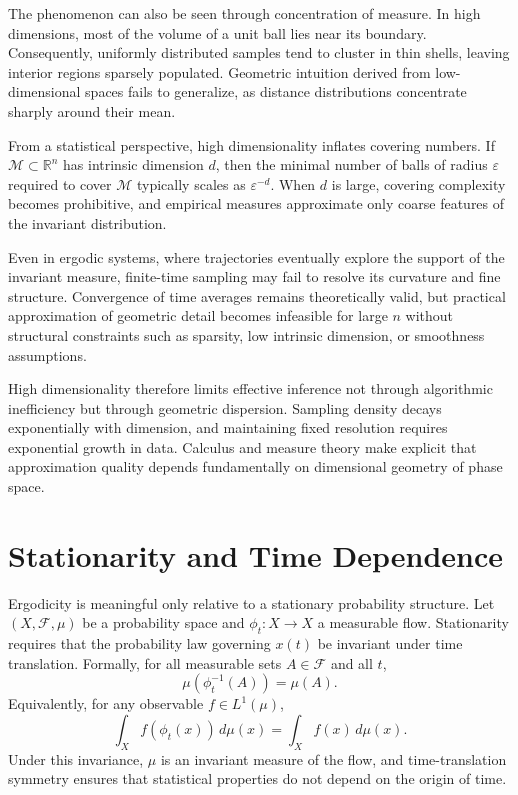 \documentclass[12pt]{book}
\begin{document}
The phenomenon can also be seen through concentration of measure. In high dimensions, most of the volume of a unit ball lies near its boundary. Consequently, uniformly distributed samples tend to cluster in thin shells, leaving interior regions sparsely populated. Geometric intuition derived from low-dimensional spaces fails to generalize, as distance distributions concentrate sharply around their mean.

From a statistical perspective, high dimensionality inflates covering numbers. If $\mathcal{M} \subset \mathbb{R}^n$ has intrinsic dimension $d$, then the minimal number of balls of radius $\varepsilon$ required to cover $\mathcal{M}$ typically scales as $\varepsilon^{-d}$. When $d$ is large, covering complexity becomes prohibitive, and empirical measures approximate only coarse features of the invariant distribution.

Even in ergodic systems, where trajectories eventually explore the support of the invariant measure, finite-time sampling may fail to resolve its curvature and fine structure. Convergence of time averages remains theoretically valid, but practical approximation of geometric detail becomes infeasible for large $n$ without structural constraints such as sparsity, low intrinsic dimension, or smoothness assumptions.

High dimensionality therefore limits effective inference not through algorithmic inefficiency but through geometric dispersion. Sampling density decays exponentially with dimension, and maintaining fixed resolution requires exponential growth in data. Calculus and measure theory make explicit that approximation quality depends fundamentally on dimensional geometry of phase space.

\section{Stationarity and Time Dependence}

Ergodicity is meaningful only relative to a stationary probability structure. Let $(X,\mathcal{F},\mu)$ be a probability space and $\phi_t : X \to X$ a measurable flow. Stationarity requires that the probability law governing $x(t)$ be invariant under time translation. Formally, for all measurable sets $A \in \mathcal{F}$ and all $t$,
\[
\mu(\phi_t^{-1}(A)) = \mu(A).
\]
Equivalently, for any observable $f \in L^1(\mu)$,
\[
\int_X f(\phi_t(x))\, d\mu(x)
=
\int_X f(x)\, d\mu(x).
\]
Under this invariance, $\mu$ is an invariant measure of the flow, and time-translation symmetry ensures that statistical properties do not depend on the origin of time.
\end{document}
